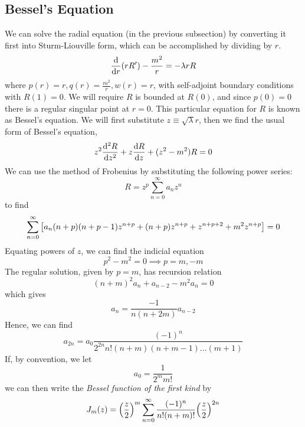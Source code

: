 \subsection{Bessel's Equation}
We can solve the radial equation (in the previous subsection) by converting it first into Sturm-Liouville form, which can be accomplished by dividing by \( r \).
\[ \dv{r} \qty(r R') - \frac{m^2}{r} = -\lambda r R \]
where \( p(r) = r, q(r) = \frac{m^2}{r}, w(r) = r \), with self-adjoint boundary conditions with \( R(1) = 0 \).
We will require \( R \) is bounded at \( R(0) \), and since \( p(0) = 0 \) there is a regular singular point at \( r = 0 \).
This particular equation for \( R \) is known as Bessel's equation.
We will first substitute \( z \equiv \sqrt{\lambda} r \), then we find the usual form of Bessel's equation,
\[ z^2 \dv[2]{R}{z} + z \dv{R}{z} + (z^2 - m^2)R = 0 \]
We can use the method of Frobenius by substituting the following power series:
\[ R = z^p \sum_{n=0}^\infty a_n z^n \]
to find
\[ \sum_{n=0}^\infty \qty[ a_n (n+p)(n+p-1) z^{n+p} + (n+p) z^{n+p} + z^{n+p+2} + m^2 z^{n+p} ] = 0 \]
Equating powers of \( z \), we can find the indicial equation
\[ p^2 - m^2 = 0 \implies p = m, -m \]
The regular solution, given by \( p = m \), has recursion relation
\[ (n+m)^2 a_n + a_{n-2} - m^2 a_n = 0 \]
which gives
\[ a_n = \frac{-1}{n(n+2m)} a_{n-2} \]
Hence, we can find
\[ a_{2n} = a_0 \frac{(-1)^n}{2^{2n} n! (n+m)(n+m-1) \dots (m+1)} \]
If, by convention, we let
\[ a_0 = \frac{1}{2^m m!} \]
we can then write the \textit{Bessel function of the first kind} by
\[ J_m(z) = \qty(\frac{z}{2})^m \sum_{n=0}^\infty \frac{(-1)^n}{n! (n+m)!} \qty(\frac{z}{2})^{2n} \]
